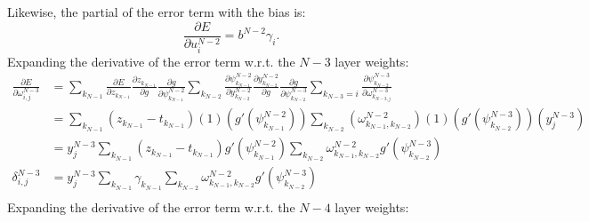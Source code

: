 \documentclass{article}
\begin{document}
%
Likewise, the partial of the error term with the bias is:
%
\begin{equation} \label{eq:d_bias}
\frac{\partial E}{\partial u_{i}^{N-2}} =
b^{N-2}
\gamma_i.
\end{equation}
%
Expanding the derivative of the error term w.r.t. the $N-3$ layer weights:
%
\begin{equation} \label{eq:derive_du_nm3}
\begin{aligned}
\frac{\partial E}{\partial \omega_{i,j}^{N-3}} &= 
%
\sum_{k_{N-1}}
\frac{\partial E}{\partial z_{k_{N-1}}}
\frac{\partial z_{k_{N-1}}}{\partial g}
\frac{\partial g}{\partial \psi_{k_{N-1}}^{N-2}}
%
\sum_{k_{N-2}}
\frac{\partial \psi_{k_{N-1}}^{N-2}}{\partial y_{k_{N-2}}^{N-2}}
\frac{\partial y_{k_{N-2}}^{N-2}}{\partial g}
\frac{\partial g}{\partial \psi_{k_{N-2}}^{N-3}}
%
\sum_{k_{N-3}=i}
\frac{\partial \psi_{k_{N-2}}^{N-3}}{\partial \omega_{k_{N-3,j}}^{N-3}} \\
& = \sum_{k_{N-1}}
\left( z_{k_{N-1}} - t_{k_{N-1}} \right)
%
(1)
\left( g' \left( \psi_{k_{N-1}}^{N-2} \right) \right)
%
\sum_{k_{N-2}}
\left( \omega_{k_{N-1},k_{N-2}}^{N-2} \right)
(1)
\left( g' (\psi_{k_{N-2}}^{N-3}) \right)
\left( y_j^{N-3} \right) \\
& = y_j^{N-3} \sum_{k_{N-1}}
\left(z_{k_{N-1}} - t_{k_{N-1}}\right)
%
g' \left(\psi_{k_{N-1}}^{N-2}\right)
%
\sum_{k_{N-2}}
\omega_{k_{N-1},k_{N-2}}^{N-2}
g' \left( \psi_{k_{N-2}}^{N-3} \right) \\
\delta_{i,j}^{N-3} & = y_j^{N-3} \sum_{k_{N-1}}
\gamma_{k_{N-1}}
%
\sum_{k_{N-2}}
\omega_{k_{N-1},k_{N-2}}^{N-2}
g' \left( \psi_{k_{N-2}}^{N-3} \right) \\
\end{aligned}
\end{equation}
%
Expanding the derivative of the error term w.r.t. the $N-4$ layer weights:
%
\end{document}
